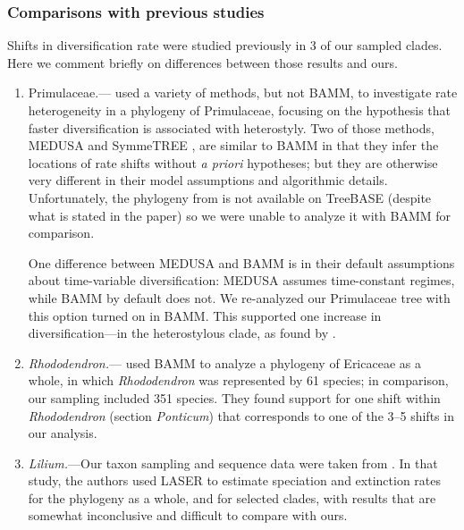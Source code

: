 \subsubsection*{Comparisons with previous studies}

Shifts in diversification rate were studied previously in 3 of our
sampled clades. Here we comment briefly on differences between those
results and ours.

\begin{enumerate}%

\item Primulaceae.---\citet{deVos2014} used a variety of methods, but
  not BAMM, to investigate rate heterogeneity in a phylogeny of
  Primulaceae, focusing on the hypothesis that faster diversification
  is associated with heterostyly. Two of those methods, MEDUSA
  \citep{alfaro2009} and SymmeTREE \citep{chan2005}, are similar to
  BAMM in that they infer the locations of rate shifts without
  \textit{a priori} hypotheses; but they are otherwise very different
  in their model assumptions and algorithmic details. Unfortunately,
  the phylogeny from \citet{deVos2014} is not available on TreeBASE
  (despite what is stated in the paper) so we were unable to analyze
  it with BAMM for comparison.

  One difference between MEDUSA and BAMM is in their default
  assumptions about time-variable diversification: MEDUSA assumes
  time-constant regimes, while BAMM by default does not. We
  re-analyzed our Primulaceae tree with this option turned on in
  BAMM. This supported one increase in diversification---in the
  heterostylous clade, as found by \citet{deVos2014}.

\item \textit{Rhododendron.}---\citet{Schwery2015} used BAMM to
  analyze a phylogeny of Ericaceae as a whole, in which
  \textit{Rhododendron} was represented by 61 species; in comparison,
  our sampling included 351 species. They found support for one shift
  within \textit{Rhododendron} (section \textit{Ponticum}) that
  corresponds to one of the 3--5 shifts in our analysis.

\item \textit{Lilium.}---Our taxon sampling and sequence data were
  taken from \citet{gao2013}. In that study, the authors used LASER
  \citep{rabosky2007} to estimate speciation and extinction rates for
  the phylogeny as a whole, and for selected clades, with results that
  are somewhat inconclusive and difficult to compare with ours.
\end{enumerate}


\clearpage
\newpage

\clearpage
\newpage


